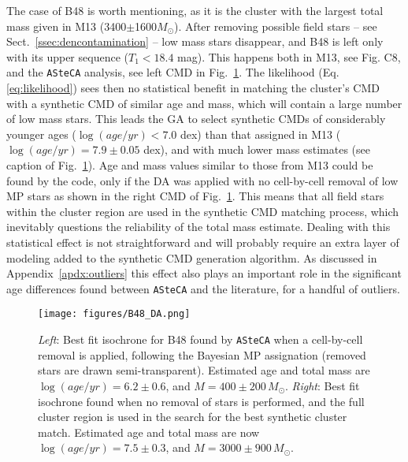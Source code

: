 \documentclass[referee]{aa}
\begin{document}
The case of B48 is worth mentioning, as it is the cluster with the largest total
mass given in M13 (3400$\pm$1600$M_{\odot}$).
After removing possible field stars -- see Sect.~\ref{ssec:dencontamination} --
low mass stars disappear, and B48 is left only with its upper sequence 
($T_1<18.4$ mag). This happens both in M13, see Fig. C8, and the
\texttt{ASteCA} analysis, see left CMD in Fig.~\ref{fig:B48_DA}.
%
The likelihood (Eq.\ref{eq:likelihood}) sees then no statistical benefit in
matching the cluster's CMD with a synthetic CMD of similar age and mass,
which will contain a large number of low mass stars.
This leads the GA to select synthetic CMDs of considerably younger ages
($\log(age/yr){<}7.0$ dex) than that assigned in M13
($\log(age/yr){=}7.9\pm0.05$ dex), and with much lower mass estimates (see
caption of Fig.~\ref{fig:B48_DA}).
%
%
Age and mass values similar to those from M13 could be found by the code, only
if the DA was applied with no cell-by-cell removal of low MP stars as shown in
the right CMD of Fig.~\ref{fig:B48_DA}. This means that all field stars within
the cluster region are used in the synthetic CMD matching process, which
inevitably questions the reliability of the total mass estimate.
%
Dealing with this statistical effect is not straightforward and will probably
require an extra layer of modeling added to the synthetic CMD generation
algorithm.
As discussed in Appendix~\ref{apdx:outliers} this effect also plays an
important role in the significant age differences found between \texttt{ASteCA}
and the literature, for a handful of outliers.

\begin{figure}
\centering
\texttt{[image: figures/B48\_DA.png]}
\caption{\emph{Left}: Best fit isochrone for B48 found by \texttt{ASteCA} when
a cell-by-cell removal is applied, following the Bayesian MP assignation 
(removed stars are drawn semi-transparent). Estimated age and
total mass are $\log(age/yr){=}6.2{\pm}0.6$, and $M{=}400{\pm}200\,M_{\odot}$.
\emph{Right}: Best fit isochrone found when no removal of stars is performed,
and the full cluster region is used in the search for the best synthetic
cluster match. Estimated age and total mass are now
$\log(age/yr){=}7.5{\pm}0.3$, and $M{=}3000{\pm}900\,M_{\odot}$.}
\label{fig:B48_DA}
\end{figure}
\end{document}

